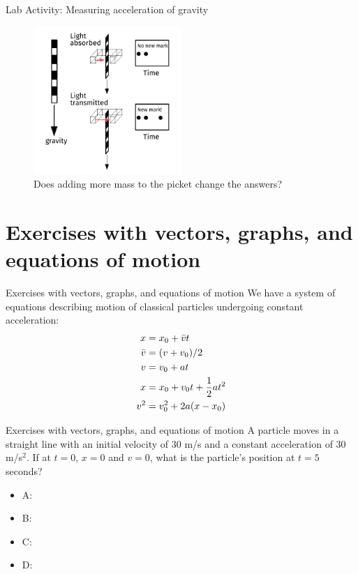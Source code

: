 \documentclass{beamer}
\begin{document}
\begin{frame}{Lab Activity: Measuring acceleration of gravity}
\small
\begin{figure}
\centering
\includegraphics[width=0.5\textwidth]{figures/PicketG.pdf}
\caption{\label{fig:picket3} Does adding more mass to the picket change the answers?}
\end{figure}
\end{frame}

\section{Exercises with vectors, graphs, and equations of motion}

\begin{frame}{Exercises with vectors, graphs, and equations of motion}
We have a system of equations describing motion of classical particles undergoing constant acceleration:
\begin{align}
x &= x_{\rm 0} +\bar{v}t \\
\bar{v} &= (v+v_{\rm 0})/2 \\
v &= v_{\rm 0} + at \\
x &= x_{\rm 0} + v_{\rm 0} t + 	\frac{1}{2}at^2 \\
v^2 &= v_{\rm 0}^2 + 2a(x-x_{\rm 0})
\end{align}
\end{frame}

\begin{frame}{Exercises with vectors, graphs, and equations of motion}
A particle moves in a straight line with an initial velocity of 30 m/s and a constant acceleration of 30 m/s$^2$.  If at $t=0$, $x=0$ and $v=0$, what is the particle’s position at $t=5$ seconds? \\
\begin{itemize}
\item A: 
\item B: 
\item C: 
\item D: 
\end{itemize}
\end{frame}
\end{document}
